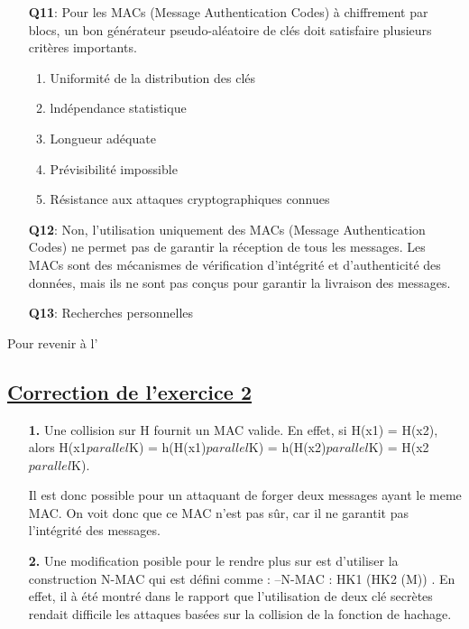 \begin{enumerate}
    \item [\textbf{Q11}:] Pour les MACs (Message Authentication Codes) à chiffrement par blocs, un bon générateur pseudo-aléatoire de clés doit satisfaire plusieurs critères importants.
    \begin{enumerate}
        \item Uniformité de la distribution des clés
        \item lndépendance statistique
        \item Longueur adéquate
        \item Prévisibilité impossible
        \item Résistance aux attaques cryptographiques connues
    \end{enumerate}
    
    \item [\textbf{Q12}:] Non, l'utilisation uniquement des MACs (Message Authentication Codes) ne permet pas de garantir la réception de tous les messages. Les MACs sont des mécanismes de vérification d'intégrité et d'authenticité des données, mais ils ne sont pas conçus pour garantir la livraison des messages.
    
    \item [\textbf{Q13}:] Recherches personnelles\\
\end{enumerate}

\par Pour revenir à l'

\subsection{\textbf{\underline{Correction de l'exercice 2}}}\label{C_Exo 2}

\begin{enumerate}
    \item [\textbf{1.}] Une collision sur H fournit un MAC valide. En effet, si H(x1) = H(x2), alors H(x1$parallel$K) = h(H(x1)$parallel$K) = h(H(x2)$parallel$K) = H(x2$parallel$K).

    Il est donc possible pour un attaquant de forger deux messages ayant le meme MAC.
    On voit donc que ce MAC n’est pas sûr, car il ne garantit pas l’intégrité des messages.
    
    \item [\textbf{2.}] Une modification posible pour le rendre plus sur est d’utiliser la construction N-MAC qui est défini comme : –N-MAC : HK1 (HK2 (M)) . En effet, il à été montré dans le rapport que l’utilisation de deux clé secrètes rendait difficile les attaques basées sur la collision de la fonction de hachage.\\
\end{enumerate}

